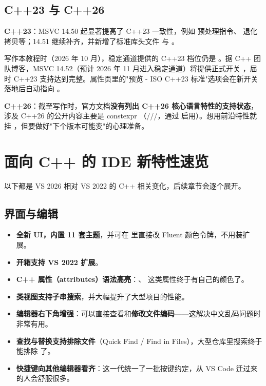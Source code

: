 \subsection{C++23 与 C++26}
\textbf{C++23}：MSVC 14.50 起显著提高了 C++23 一致性，例如  预处理指令、 退化拷贝等；14.51 继续补齐，并新增了标准库头文件 \textbf{} 与 \textbf{}。

\begin{warnbox}[注意]
写作本教程时（2026 年 10 月），稳定通道提供的 C++23 档位仍是 \textbf{}。据 C++ 团队博客，MSVC 14.52（预计 2026 年 11 月进入稳定通道）将提供正式开关 \textbf{}，届时 C++23 支持达到完整。属性页里的"预览 - ISO C++23 标准"选项会在新开关落地后自动指向 。
\end{warnbox}

\textbf{C++26}：截至写作时，官方文档\textbf{没有列出 C++26 核心语言特性的支持状态}，涉及 C++26 的公开内容主要是 constexpr （///，通过  启用）。想用前沿特性就挂 ，但要做好"下个版本可能变"的心理准备。

\section{面向 C++ 的 IDE 新特性速览}
以下都是 VS 2026 相对 VS 2022 的 C++ 相关变化，后续章节会逐个展开。

\subsection{界面与编辑}
\begin{itemize}
  \item \textbf{全新 UI，内置 11 套主题}，并可在  里直接改 Fluent 颜色令牌，不用装扩展。
  \item \textbf{开箱支持 VS 2022 扩展}。
  \item \textbf{C++ 属性（attributes）语法高亮}：\code{[[nodiscard]]}、 这类属性终于有自己的颜色了。
  \item \textbf{类视图支持子串搜索}，并大幅提升了大型项目的性能。
  \item \textbf{编辑器右下角增强}：可以直接查看和\textbf{修改文件编码}——这解决中文乱码问题时非常有用。
  \item \textbf{查找与替换支持排除文件}（Quick Find / Find in Files），大型仓库里搜索终于能排除  了。
  \item \textbf{快捷键向其他编辑器看齐}：这一代统一了一批按键约定，从 VS Code 迁过来的人会舒服很多。
\end{itemize}

